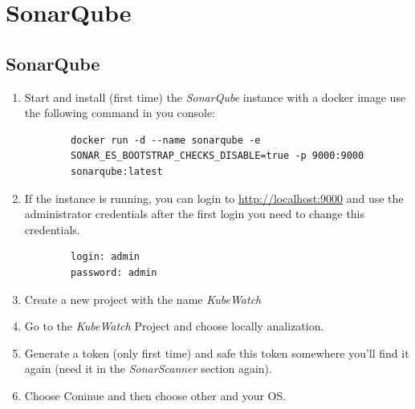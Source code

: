 \chapter{SonarQube}
\label{sonarqube}

\section{SonarQube}
\begin{enumerate}
    \item Start and install (first time) the \textit{SonarQube} instance with a docker image use the following command in you console: \begin{lstlisting}
        docker run -d --name sonarqube -e
        SONAR_ES_BOOTSTRAP_CHECKS_DISABLE=true -p 9000:9000
        sonarqube:latest
    \end{lstlisting}
    \item If the instance is running, you can login to \href{http://localhost:9000}{http://localhost:9000} and use the administrator credentials after the first login you need to change this credentials.
    \begin{lstlisting}
        login: admin
        password: admin
    \end{lstlisting}
    \item Create a new project with the name \textit{KubeWatch}
    \item Go to the \textit{KubeWatch} Project and choose locally analization.
    \item Generate a token (only first time) and safe this token somewhere you'll find it again (need it in the \textit{SonarScanner} section again).
    \item Choose Coninue and then choose other and your OS.
\end{enumerate}

